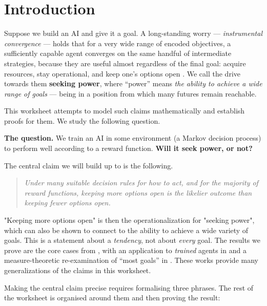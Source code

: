 \documentclass[11pt]{article}
\begin{document}
\section*{Introduction}


Suppose we build an AI and give it a goal.
A long-standing worry --- \emph{instrumental convergence} --- holds that for a very wide
range of encoded objectives, a sufficiently capable agent converges on the same handful
of intermediate strategies, because they are useful almost regardless of the final goal:
acquire resources, stay operational, and keep one's options open
\cite{omohundro2008basic,bostrom2014superintelligence}. We call the drive towards
them \textbf{seeking power}, where ``power'' means \emph{the ability to achieve a wide
range of goals} --- being in a position from which many futures remain reachable.

This worksheet attempts to model such claims mathematically and establish proofs for them. We study the following question.

\begin{callout}
\textbf{The question.}
We train an AI in some environment (a Markov decision process) to perform well according
to a reward function. \textbf{Will it seek power, or not?}
\end{callout}

The central claim we will
build up to is the following.

\begin{quote}
\emph{Under many suitable decision rules for how to act, and for the majority of reward
functions, keeping more options open is the likelier outcome than keeping fewer options
open.}
\end{quote}

"Keeping more options open" is then the operationalization for "seeking power", which can also be shown to connect to the ability to achieve a wide variety of goals.
This is a statement about a \emph{tendency}, not about \emph{every} goal. The results we prove are the core cases from
\cite{turner2021optimal,turner2022parametrically}, with an application to
\emph{trained} agents in \cite{krakovna2023power} and a measure-theoretic re-examination
of ``most goals'' in \cite{jacek2023categorical}. These works provide many generalizations of the claims in this worksheet.

Making the central claim precise requires formalising three phrases. The rest of the
worksheet is organised around them and then proving the result:
\end{document}
